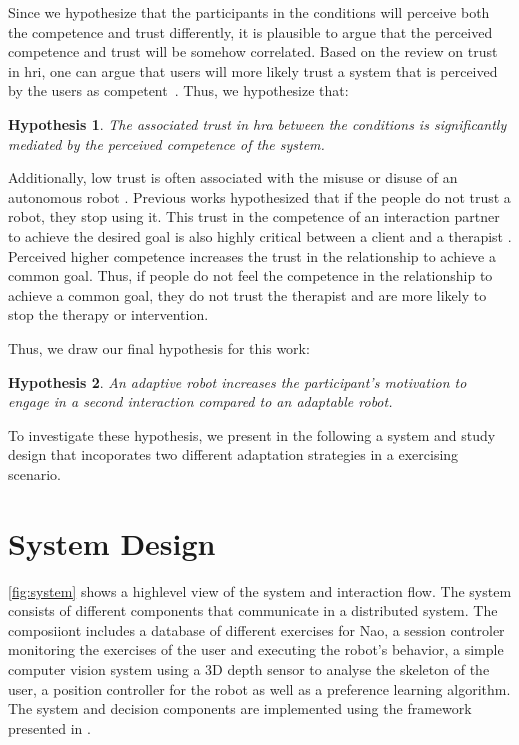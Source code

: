 \documentclass[twocolumn]{svjour3}          %
\newtheorem{hypo}{Hypothesis}
\begin{document}
Since we hypothesize that the participants in the
conditions will perceive both the competence and trust differently, it is plausible to argue that the perceived competence and trust will be somehow correlated. Based on the review on trust in \gls{hri}, one can argue that users will more likely trust a system that is perceived by the users as competent~\cite{hancock2011meta}. Thus, we hypothesize that: 

\begin{hypo}\label{hyp:adaptability:mediation}
 The associated trust in \gls{hra} between the conditions is significantly mediated by the perceived competence of the system.
\end{hypo}


Additionally, low trust is often associated with the misuse or disuse of
an autonomous robot \autocite{beer2014toward}. Previous works
hypothesized that if the people do not trust a robot, they stop using
it. This trust in the competence of an interaction partner to achieve
the desired goal is also highly critical between a client and a
therapist \autocite{horvath1989development}. Perceived higher competence
increases the trust in the relationship to achieve a common goal. Thus,
if people do not feel the competence in the relationship to achieve a
common goal, they do not trust the therapist and are more likely to stop
the therapy or intervention.

Thus, we draw our final hypothesis for this work:

\begin{hypo}\label{hyp:adaptability:motivation}
 An \textit{adaptive} robot increases the participant's motivation to engage in a second interaction compared to an \textit{adaptable} robot.
\end{hypo}

To investigate these hypothesis, we present in the following a system and study design that incoporates two different adaptation strategies in a exercising scenario.

\hypertarget{system-design}{%
\section{\texorpdfstring{System Design
\label{adaptation:sec:system}}{System Design }}\label{system-design}}

\autoref{fig:system} shows a highlevel view of the system and interaction flow. The system consists of different components that communicate in a distributed system. The composiiont includes a database of different exercises for
Nao, a session controler monitoring the exercises of the user and executing the robot's behavior, a simple
computer vision system using a 3D depth sensor to analyse the skeleton of the user, a position controller for the robot as well as a preference learning algorithm. The system and decision components are implemented using the framework presented in \cite{schneider2017framework}.
\end{document}
